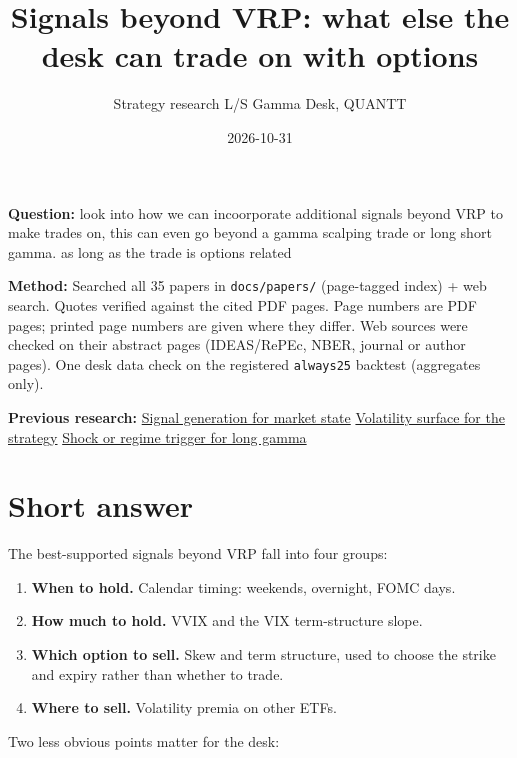 \documentclass{article}
\title{Signals beyond VRP: what else the desk can trade on with options}
\author{Strategy research \textperiodcentered{} L/S Gamma Desk, QUANTT}
\date{2026-10-31}
\begin{document}
\maketitle

\textbf{Question:} look into how we can incoorporate additional signals beyond VRP to make trades on, this can even go beyond a gamma scalping trade or long short gamma. as long as the trade is options related

\textbf{Method:} Searched all 35 papers in \texttt{docs/\allowbreak{}papers/\allowbreak{}} (page-tagged index) + web search. Quotes verified against the cited PDF pages. Page numbers are PDF pages; printed page numbers are given where they differ. Web sources were checked on their abstract pages (IDEAS/\allowbreak{}RePEc, NBER, journal or author pages). One desk data check on the registered \texttt{always25} backtest (aggregates only).

\textbf{Previous research:} \href{2026-09-29-signal-generation-for-market-state.pdf}{Signal generation for market state} \textperiodcentered{} \href{2026-09-27-volatility-surface-for-the-strategy.pdf}{Volatility surface for the strategy} \textperiodcentered{} \href{2026-10-07-shock-or-regime-trigger-for-long-gamma.pdf}{Shock or regime trigger for long gamma}

\section{Short answer}

The best-supported signals beyond VRP fall into four groups:

\begin{enumerate}

\item \textbf{When to hold.} Calendar timing: weekends, overnight, FOMC days.

\item \textbf{How much to hold.} VVIX and the VIX term-structure slope.

\item \textbf{Which option to sell.} Skew and term structure, used to choose the strike and expiry rather than whether to trade.

\item \textbf{Where to sell.} Volatility premia on other ETFs.

\end{enumerate}

Two less obvious points matter for the desk:
\end{document}
